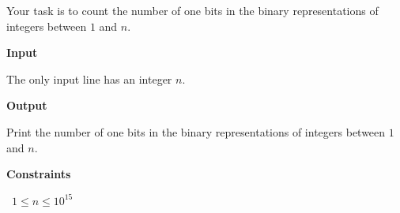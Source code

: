 Your task is to count the number of one bits in the binary representations of integers between $1$ and $n$.

\vspace{0.3cm}\noindent\textbf{Input}

The only input line has an integer $n$.

\vspace{0.3cm}\noindent\textbf{Output}

Print the number of one bits in the binary representations of integers between $1$ and $n$.

\vspace{0.3cm}\noindent\textbf{Constraints}

\textbullet\ $1 \le n \le 10^{15}$